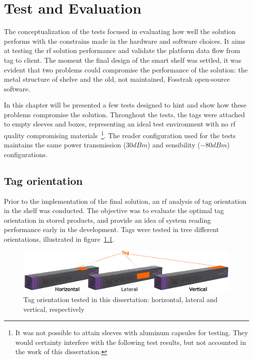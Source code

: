 \chapter{Test and Evaluation} \label{sec:tests}

The conceptualization of the tests focused in evaluating how well the solution performs with the constrains made in the hardware and software choices. It aims at testing the \ac{rf} solution performance and validate the platform data flow from tag to client.
The moment the final design of the smart shelf was settled, it was evident that two problems could compromise the performance of the solution: the metal structure of shelve and the old, not maintained, Fosstrak open-source software.

In this chapter will be presented a few tests designed to hint and show how these problems compromise the solution. Throughout the tests, the tags were attached to empty sleeves and boxes, representing an ideal test environment with no \ac{rf} quality compromising materials~\footnote{It was not possible to attain sleeves with aluminum capsules for testing. They would certainty interfere with the following test results, but not accounted in the work of this dissertation.}.
The reader configuration used for the tests maintains the same power transmission ($30dBm$) and sensibility ($-80dBm$) configurations.

\section{Tag orientation} \label{sec:test1}

Prior to the implementation of the final solution, an \ac{rf} analysis of tag orientation in the shelf was conducted.
The objective was to evaluate the optimal tag orientation in stored products, and provide an idea of system reading performance early in the development.
Tags were tested in tree different orientations, illustrated in figure~\ref{fig:tagorientations}.

\begin{figure}
    \centering
    \includegraphics[width=\textwidth]{figs/tests/tag_positions.eps}
    \caption{Tag orientation tested in this dissertation: horizontal, lateral and vertical, respectively}
    \label{fig:tagorientations}
\end{figure}


